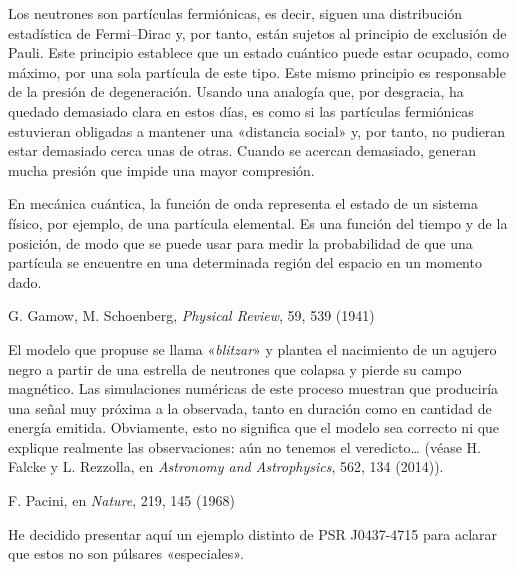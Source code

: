\begin{description}[style=multiline,leftmargin=2em,labelwidth=1.5em]
\item[9.]\hypertarget{note:05-09}{}Los neutrones son partículas fermiónicas, es decir, siguen una distribución estadística de Fermi--Dirac y, por tanto, están sujetos al principio de exclusión de Pauli. Este principio establece que un estado cuántico puede estar ocupado, como máximo, por una sola partícula de este tipo. Este mismo principio es responsable de la presión de degeneración. Usando una analogía que, por desgracia, ha quedado demasiado clara en estos días, es como si las partículas fermiónicas estuvieran obligadas a mantener una «distancia social» y, por tanto, no pudieran estar demasiado cerca unas de otras. Cuando se acercan demasiado, generan mucha presión que impide una mayor compresión.

\item[10.]\hypertarget{note:05-10}{}En mecánica cuántica, la función de onda representa el estado de un sistema físico, por ejemplo, de una partícula elemental. Es una función del tiempo y de la posición, de modo que se puede usar para medir la probabilidad de que una partícula se encuentre en una determinada región del espacio en un momento dado.

\item[11.]\hypertarget{note:05-11}{}G. Gamow, M. Schoenberg, \emph{Physical Review}, 59, 539 (1941)

\item[12.]\hypertarget{note:05-12}{}El modelo que propuse se llama «\emph{blitzar}» y plantea el nacimiento de un agujero negro a partir de una estrella de neutrones que colapsa y pierde su campo magnético. Las simulaciones numéricas de este proceso muestran que produciría una señal muy próxima a la observada, tanto en duración como en cantidad de energía emitida. Obviamente, esto no significa que el modelo sea correcto ni que explique realmente las observaciones: aún no tenemos el veredicto… (véase H. Falcke y L. Rezzolla, en \emph{Astronomy and Astrophysics}, 562, 134 (2014)).

\item[13.]\hypertarget{note:05-13}{}F. Pacini, en \emph{Nature}, 219, 145 (1968)

\item[14.]\hypertarget{note:05-14}{}He decidido presentar aquí un ejemplo distinto de PSR J0437-4715 para aclarar que estos no son púlsares «especiales».

\end{description}
